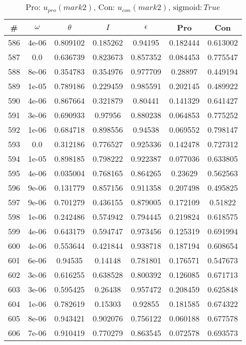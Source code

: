 \newpage
\begin{table}
\caption{Pro: $u_{pro} (mark 2)$, Con: $u_{con} (mark 2)$, $\mathrm{sigmoid}: True$}
\begin{tabular*}{\linewidth}{c|c|c|c|c|c|c}
\# & $\omega$ & $\theta$ & $I$ & $\epsilon$ & Pro & Con \\
\hline
586 & 4e-06 & 0.809102 & 0.185262 & 0.94195 & 0.182444 & 0.613002\\
587 & 0.0 & 0.636739 & 0.823673 & 0.857352 & 0.084453 & 0.775547\\
588 & 8e-06 & 0.354783 & 0.354976 & 0.977709 & 0.28897 & 0.449194\\
589 & 1e-05 & 0.789186 & 0.229459 & 0.985591 & 0.202145 & 0.489922\\
590 & 4e-06 & 0.867664 & 0.321879 & 0.80441 & 0.141329 & 0.641427\\
591 & 3e-06 & 0.690933 & 0.97956 & 0.880238 & 0.064853 & 0.775252\\
592 & 1e-06 & 0.684718 & 0.898556 & 0.94538 & 0.069552 & 0.798147\\
593 & 0.0 & 0.312186 & 0.776527 & 0.925336 & 0.142478 & 0.727312\\
594 & 1e-05 & 0.898185 & 0.798222 & 0.922387 & 0.077036 & 0.633805\\
595 & 4e-06 & 0.035004 & 0.768165 & 0.864265 & 0.23629 & 0.562563\\
596 & 9e-06 & 0.131779 & 0.857156 & 0.911358 & 0.207498 & 0.495825\\
597 & 9e-06 & 0.701279 & 0.436155 & 0.879005 & 0.172109 & 0.51822\\
598 & 1e-06 & 0.242486 & 0.574942 & 0.794445 & 0.219824 & 0.618575\\
599 & 4e-06 & 0.643179 & 0.594747 & 0.973456 & 0.125319 & 0.691994\\
600 & 4e-06 & 0.553644 & 0.421844 & 0.938718 & 0.187194 & 0.608654\\
601 & 6e-06 & 0.94535 & 0.14148 & 0.781801 & 0.176571 & 0.547673\\
602 & 3e-06 & 0.616255 & 0.638528 & 0.800392 & 0.126085 & 0.671713\\
603 & 3e-06 & 0.595425 & 0.26438 & 0.957472 & 0.208459 & 0.625848\\
604 & 1e-06 & 0.782619 & 0.15303 & 0.92855 & 0.181585 & 0.674322\\
605 & 8e-06 & 0.943421 & 0.902076 & 0.756122 & 0.060188 & 0.677578\\
606 & 7e-06 & 0.910419 & 0.770279 & 0.863545 & 0.072578 & 0.693573\\

\end{tabular*}
\end{table}
